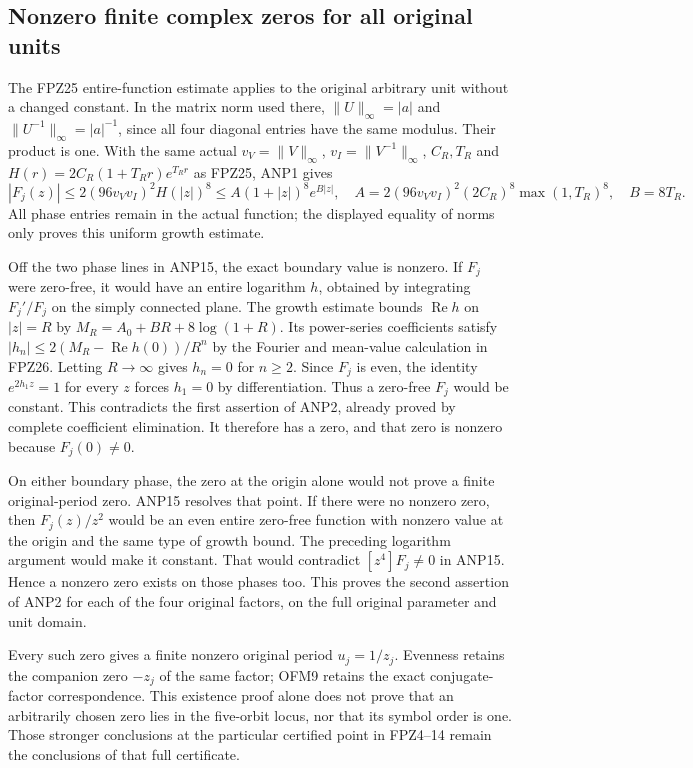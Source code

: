 \subsection{Nonzero finite complex zeros for all original units}
The FPZ25 entire-function estimate applies to the original arbitrary
unit without a changed constant. In the matrix norm used there,
$\|U\|_\infty=|a|$ and $\|U^{-1}\|_\infty=|a|^{-1}$, since
all four diagonal entries have the same modulus. Their product is one.
With the same actual $v_V=\|V\|_\infty$, $v_I=\|V^{-1}\|_\infty$,
$C_R,T_R$ and $H(r)=2C_R(1+T_Rr)e^{T_Rr}$ as FPZ25, ANP1 gives
\[
 |F_j(z)|\le2(96v_Vv_I)^2H(|z|)^8
          \le A(1+|z|)^8e^{B|z|},
 \quad
 A=2(96v_Vv_I)^2(2C_R)^8\max(1,T_R)^8,\quad B=8T_R.
 \tag{ANP16}
\]
All phase entries remain in the actual function; the displayed
equality of norms only proves this uniform growth estimate.

Off the two phase lines in ANP15, the exact boundary value is nonzero.
If $F_j$ were zero-free, it would have an entire logarithm $h$,
obtained by integrating $F_j'/F_j$ on the simply connected plane.
The growth estimate bounds $\operatorname{Re}h$ on $|z|=R$ by
$M_R=A_0+BR+8\log(1+R)$. Its power-series coefficients satisfy
$|h_n|\le2(M_R-\operatorname{Re}h(0))/R^n$ by the Fourier and
mean-value calculation in FPZ26. Letting $R\to\infty$ gives
$h_n=0$ for $n\ge2$. Since $F_j$ is even, the identity
$e^{2h_1z}=1$ for every $z$ forces $h_1=0$ by differentiation.
Thus a zero-free $F_j$ would be constant. This contradicts the first
assertion of ANP2, already proved by complete coefficient elimination.
It therefore has a zero, and that zero is nonzero because $F_j(0)\ne0$.

On either boundary phase, the zero at the origin alone would not
prove a finite original-period zero. ANP15 resolves that point.
If there were no nonzero zero, then $F_j(z)/z^2$ would be an even
entire zero-free function with nonzero value at the origin and the
same type of growth bound. The preceding logarithm argument would
make it constant. That would contradict $[z^4]F_j\ne0$ in ANP15.
Hence a nonzero zero exists on those phases too.
This proves the second assertion of ANP2 for each of the four
original factors, on the full original parameter and unit domain.

Every such zero gives a finite nonzero original period $u_j=1/z_j$.
Evenness retains the companion zero $-z_j$ of the same factor;
OFM9 retains the exact conjugate-factor correspondence.
This existence proof alone does not prove that an arbitrarily chosen
zero lies in the five-orbit locus, nor that its symbol order is one.
Those stronger conclusions at the particular certified point in
FPZ4--14 remain the conclusions of that full certificate.

